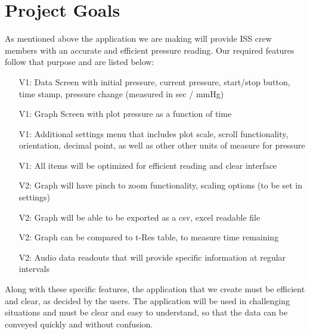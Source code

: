 \documentclass[onecolumn, draftclsnofoot,10pt, compsoc]{IEEEtran}
\begin{document}
\section{Project Goals}
As mentioned above the application we are making will provide ISS crew members with an accurate and efficient pressure reading.
Our required features follow that purpose and are listed below:
\begin{itemize}
\item[V1:] Data Screen with initial pressure, current pressure, start/stop button, time stamp, pressure change (measured in sec / mmHg)
\item[V1:] Graph Screen with plot pressure as a function of time
\item[V1:] Additional settings menu that includes plot scale, scroll functionality, orientation, decimal point, as well as other other units of measure for pressure
\item[V1:] All items will be optimized for efficient reading and clear interface
\item[V2:] Graph will have pinch to zoom functionality, scaling options (to be set in settings)
\item[V2:] Graph will be able to be exported as a csv, excel readable file
\item[V2:] Graph can be compared to t-Res table, to measure time remaining
\item[V2:] Audio data readouts that will provide specific information at regular intervals
\end{itemize}

Along with these specific features, the application that we create must be efficient and clear, as decided by the users.
The application will be used in challenging situations and must be clear and easy to understand, so that the data can be conveyed quickly and without confusion.

\end{document}
